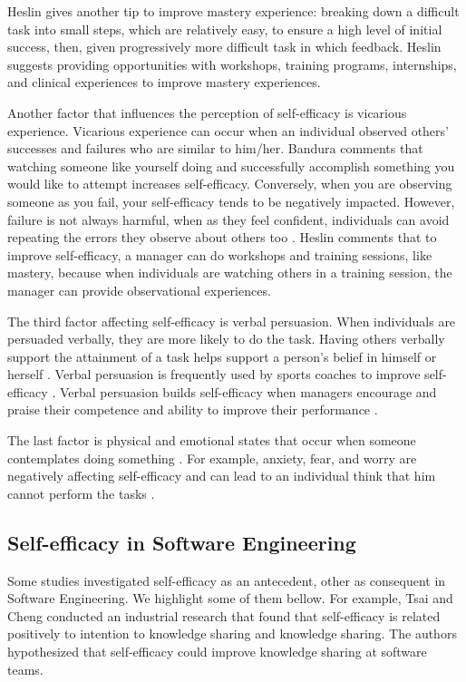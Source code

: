\documentclass[10pt, conference]{IEEEtran}
\begin{document}
Heslin \cite{heslin1999boosting} gives another tip to improve mastery experience: breaking down a difficult task into small steps, which are relatively easy, to ensure a high level of initial success, then, given progressively more difficult task in which feedback. Heslin suggests providing opportunities with workshops, training programs, internships, and clinical experiences to improve mastery experiences. 


 Another factor that influences the perception of self-efficacy is vicarious experience. Vicarious experience can occur when an individual observed others' successes and failures who are similar to him/her. Bandura \cite{bandura1977self} comments that watching someone like yourself doing and successfully accomplish something you would like to attempt increases self-efficacy. Conversely, when you are observing someone as you fail, your self-efficacy tends to be negatively impacted. However, failure is not always harmful, when as they feel confident, individuals can avoid repeating the errors they observe about others too \cite{brown2013self}. 
 Heslin \cite{heslin1999boosting} comments that to improve self-efficacy, a manager can do workshops and training sessions, like mastery, because when individuals are watching others in a training session, the manager can provide observational experiences.
 
 
 The third factor affecting self-efficacy is verbal persuasion. When individuals are persuaded verbally, they are more likely to do the task. Having others verbally support the attainment of a task helps support a person's belief in himself or herself \cite{bandura1977self}. Verbal persuasion is frequently used by sports coaches to improve self-efficacy \cite{brown2013self}. Verbal persuasion builds self-efficacy when managers encourage and praise their competence and ability to improve their performance \cite{heslin1999boosting}. 
 
The last factor is physical and emotional states that occur when someone contemplates doing something \cite{bandura1977self}. For example, anxiety, fear, and worry are negatively affecting self-efficacy and can lead to an individual think that him cannot perform the tasks \cite{pajares1996self}.


\subsection{Self-efficacy in Software Engineering}
Some studies investigated self-efficacy as an antecedent, other as consequent in Software Engineering. We highlight some of them bellow. For example, Tsai and Cheng \cite{tsai2010programmer} conducted an industrial research that found that self-efficacy is related positively to intention to knowledge sharing and knowledge sharing. The authors hypothesized that self-efficacy could improve knowledge sharing at software teams.
\end{document}

